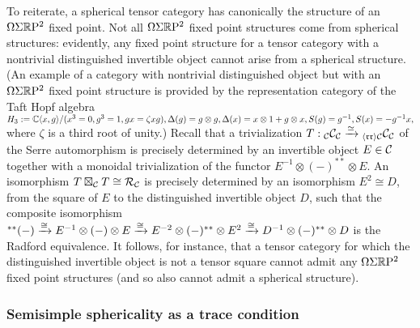 \documentclass{amsart}
\begin{document}
To reiterate, a spherical tensor category has canonically the structure of an $\Omega \Sigma \mathbb R \mathrm{P}^2$ fixed point.  Not all $\Omega \Sigma \mathbb R \mathrm{P}^2$ fixed point structures come from spherical structures: evidently, any fixed point structure for a tensor category with a nontrivial distinguished invertible object cannot arise from a spherical structure.  (An example of a category with nontrivial distinguished object but with an $\Omega \Sigma \mathbb R \mathrm{P}^2$ fixed point structure is provided by the representation category of the Taft Hopf algebra $H_3 := \mathbb C\langle x,g \rangle / (x^3=0,g^3=1,gx=\zeta xg), \Delta(g) = g \otimes g, \Delta(x) = x \otimes 1 + g \otimes x, S(g)=g^{-1}, S(x)=-g^{-1}x,$ where $\zeta$ is a third root of unity.) Recall that a trivialization $T: {}_\mathcal C \mathcal C_\mathcal C \xrightarrow{\simeq} {}_{\langle \mathfrak{r r} \rangle \mathcal C} \mathcal C_\mathcal C$ of the Serre automorphism is precisely determined by an invertible object $E \in \mathcal C$ together with a monoidal trivialization of the functor $E^{-1} \otimes (-)^{**} \otimes E$.  An isomorphism $T \boxtimes_\mathcal C T \cong \mathcal R_\mathcal C$ is precisely determined by an isomorphism $E^2 \cong D$, from the square of $E$ to the distinguished invertible object $D$, such that the composite isomorphism ${}^{**} (-) \xrightarrow{\cong} E^{-1} \otimes (-) \otimes E \xrightarrow{\cong} E^{-2} \otimes (-)^{**} \otimes E^2 \xrightarrow{\cong} D^{-1} \otimes (-)^{**} \otimes D$ is the Radford equivalence.  It follows, for instance, that a tensor category for which the distinguished invertible object is not a tensor square cannot admit any $\Omega \Sigma \mathbb R \mathrm{P}^2$ fixed point structures (and so also cannot admit a spherical structure). %


\subsubsection{Semisimple sphericality as a trace condition}
\end{document}
